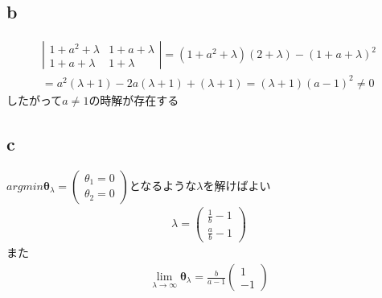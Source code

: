 \documentclass[uplatex,b5j]{jsarticle} %
\begin{document}
\subsection{b}
\begin{eqnarray}
    \left| \begin{array}{cc} 1+a^2+\lambda & 1+a+\lambda \\ 1+a+\lambda & 1+\lambda \end{array} \right|
    = (1+a^2+\lambda)(2+\lambda)-(1+a+\lambda)^2 \\ \nonumber
    = a^2(\lambda+1)-2a(\lambda+1)+(\lambda+1) = (\lambda+1)(a-1)^2 \neq 0
\end{eqnarray}
したがって$a\neq1$の時解が存在する
\subsection{c}
$argmin\boldsymbol{\theta}_\lambda=\left( \begin{array}{c} \theta_1=0 \\ \theta_2=0 \end{array} \right)$となるような$\lambda$を解けばよい
\begin{eqnarray}
    \lambda = \left( \begin{array}{c} \frac{1}{b}-1 \\ \frac{a}{b}-1 \end{array} \right)
\end{eqnarray}
また
\begin{eqnarray}
    \lim_{\lambda\to\infty}\boldsymbol{\theta}_\lambda = \frac{b}{a-1} \left( \begin{array}{c} 1 \\ -1 \end{array} \right)
\end{eqnarray}
\end{document}
